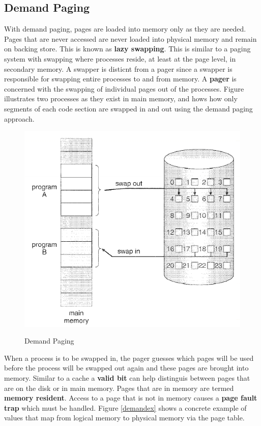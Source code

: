 \documentclass[10pt,a4paper]{article}
\begin{document}
\subsection{Demand Paging}
With demand paging, pages are loaded into memory only as they are needed. Pages that are never accessed are never loaded into physical memory and remain on backing store. This is known as {\bf lazy swapping}. This is similar to a paging system with swapping where processes reside, at least at the page level, in secondary memory. A swapper is disticnt from a pager since a swapper is responsible for swapping entire processes to and from memory. A {\bf pager} is concerned with the swapping of individual pages out of the processes. Figure \cite{demand-paging} illustrates two processes as they exist in main memory, and hows how only segments of each code section are swapped in and out using the demand paging approach. 
\begin{figure}
\caption{Demand Paging \cite{OSCONCEPTS}}
\begin{center}
\includegraphics[scale=0.45]{../images/demand-paging.png}
\label{demand-paging}
\end{center}
\end{figure}
When a process is to be swapped in, the pager guesses which pages will be used before the process will be swapped out again and these pages are brought into memory. Similar to a cache a {\bf valid bit} can help distinguis between pages that are on the disk or in main memory.  Pages that are in memory are termed {\bf memory resident}. Access to a page that is not in memory causes a {\bf page fault trap} which must be handled. Figure \ref{demandex} shows a concrete example of values that map from logical memory to physical memory via the page table. 
\end{document}
